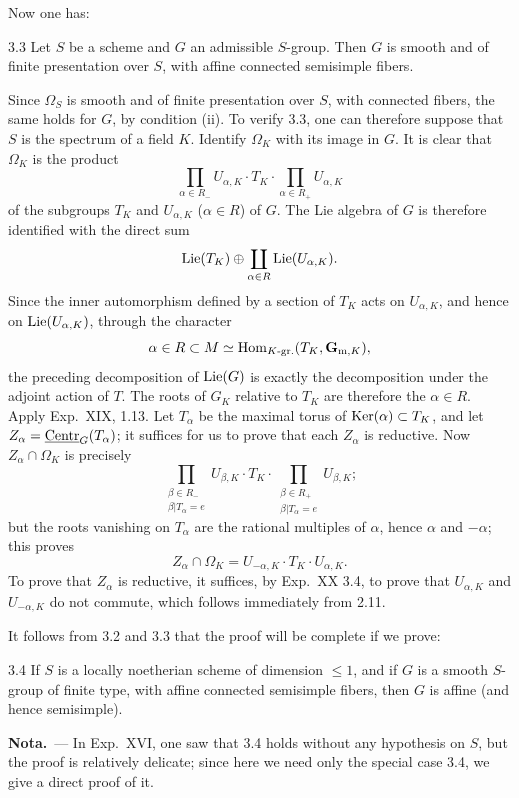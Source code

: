 Now one has:
\begin{lemma}{3.3}\label{XXV.3.3}
Let $S$ be a scheme and $G$ an admissible $S$-group. Then $G$ is smooth and of finite presentation over $S$, with affine connected semisimple fibers.
\end{lemma}
Since $\Omega_S$ is smooth and of finite presentation over $S$, with connected fibers, the same holds for $G$, by condition (ii). To verify 3.3, one can therefore suppose that $S$ is the spectrum of a field $K$. Identify $\Omega_K$ with its image in $G$. It is clear that $\Omega_K$ is the product
\[
\prod_{\alpha\in R_-}U_{\alpha,K}\cdot T_K\cdot\prod_{\alpha\in R_+}U_{\alpha,K}
\]
of the subgroups $T_K$ and $U_{\alpha,K}$ ($\alpha\in R$) of $G$. The Lie algebra of $G$ is therefore identified with the direct sum
\[
\operatorname{Lie}(T_K)\oplus\coprod_{\alpha\in R}\operatorname{Lie}(U_{\alpha,K}).
\]
Since the inner automorphism defined by a section of $T_K$ acts on $U_{\alpha,K}$, and hence on $\operatorname{Lie}(U_{\alpha,K})$, through the character
\[
\alpha\in R\subset M\simeq\operatorname{Hom}_{K\text{-gr.}}(T_K,\mathbf G_{\mathrm m,K}),
\]
the preceding decomposition of $\operatorname{Lie}(G)$ is exactly the decomposition under the adjoint action of $T$. The roots of $G_K$ relative to $T_K$ are therefore the $\alpha\in R$. Apply Exp.~XIX, 1.13. Let $T_\alpha$ be the maximal torus of $\operatorname{Ker}(\alpha)\subset T_K$, and let $Z_\alpha=\underline{\mathrm{Centr}}_G(T_\alpha)$; it suffices for us to prove that each $Z_\alpha$ is reductive. Now $Z_\alpha\cap\Omega_K$ is precisely
\[
\prod_{\substack{\beta\in R_-\\\beta|T_\alpha=e}}U_{\beta,K}\cdot T_K\cdot
\prod_{\substack{\beta\in R_+\\\beta|T_\alpha=e}}U_{\beta,K};
\]
but the roots vanishing on $T_\alpha$ are the rational multiples of $\alpha$, hence $\alpha$ and $-\alpha$; this proves
\[
Z_\alpha\cap\Omega_K=U_{-\alpha,K}\cdot T_K\cdot U_{\alpha,K}.
\]
To prove that $Z_\alpha$ is reductive, it suffices, by Exp.~XX 3.4, to prove that $U_{\alpha,K}$ and $U_{-\alpha,K}$ do not commute, which follows immediately from 2.11.

It follows from 3.2 and 3.3 that the proof will be complete if we prove:
\begin{lemma}{3.4}\label{XXV.3.4}
If $S$ is a locally noetherian scheme of dimension $\le1$, and if $G$ is a smooth $S$-group of finite type, with affine connected semisimple fibers, then $G$ is affine (and hence semisimple).
\end{lemma}
\noindent\textbf{Nota.}\ --- In Exp.~XVI, one saw that 3.4 holds without any hypothesis on $S$, but the proof is relatively delicate; since here we need only the special case 3.4, we give a direct proof of it.

